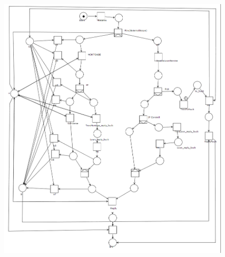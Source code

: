 \documentclass[
10pt, %
a4paper, %
oneside, %
headinclude,footinclude, %
BCOR5mm, %
]{scrartcl}
\begin{document}
\begin{figure}[tb]
\centering 
\includegraphics[width=1.1\columnwidth]{./pictures/WorkFlow.png} 
\caption[WorkFlow]{}  %
\label{fig:WorkFlow} 
\end{figure}
\end{document}
